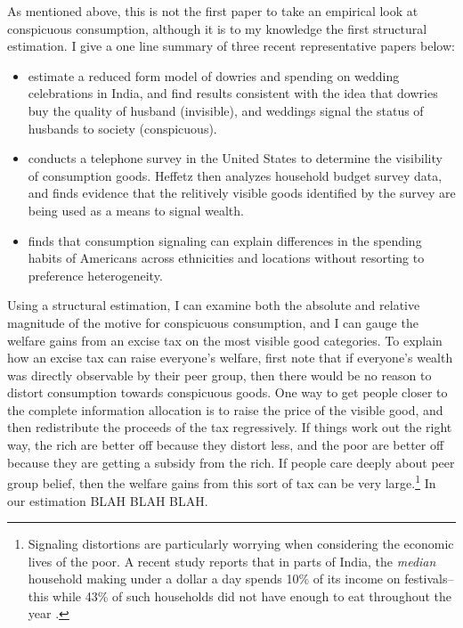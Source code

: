 \documentclass{article}
\begin{document}
As mentioned above, this is not the first paper to take an empirical look at conspicuous consumption, although it is to my knowledge the first structural estimation.
I give a one line summary of three recent representative papers below:
\begin{itemize}
	\item \citet{Blochetal2004} estimate a reduced form model of dowries and spending on wedding celebrations in India, and find results consistent with the idea that dowries buy the quality of husband (invisible), and weddings signal the status of husbands to society (conspicuous).  
	\item \citet{Heffetz2011} conducts a telephone survey in the United States to determine the visibility of consumption goods.  Heffetz then analyzes household budget survey data, and finds evidence that the relitively visible goods identified by the survey are being used as a means to signal wealth. 
	\item \citet{Charlesetal2009} finds that consumption signaling can explain differences in the spending habits of Americans across ethnicities and locations without resorting to preference heterogeneity.
\end{itemize}

Using a structural estimation, I can examine both the absolute and relative magnitude of the motive for conspicuous consumption, and I can gauge the welfare gains from an excise tax on the most visible good categories.  To explain how an excise tax can raise everyone's welfare, first note that if everyone's wealth was directly observable by their peer group, then there would be no reason to distort consumption towards conspicuous goods.  One way to get people closer to the complete information allocation is to raise the price of the visible good, and then redistribute the proceeds of the tax regressively.  If things work out the right way, the rich are better off because they distort less, and the poor are better off because they are getting a subsidy from the rich.  If people care deeply about peer group belief, then the welfare gains from this sort of tax can be very large.\footnote{Signaling distortions are particularly worrying when considering the economic lives of the poor.  A recent study reports that in parts of India, the \emph{median} household making under a dollar a day spends 10\% of its income on festivals--this while 43\% of such households did not have enough to eat throughout the year \citep{BanerjeeDuflo2007}.  } In our estimation BLAH BLAH BLAH.
\end{document}
